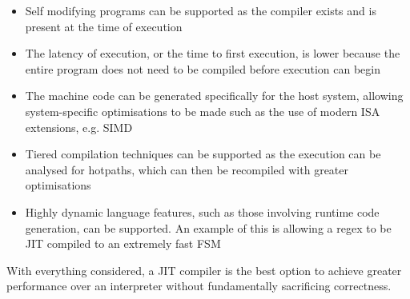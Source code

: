 \begin{itemize}
	\item Self modifying programs can be supported as the compiler exists and is present at the time of execution
	\item The latency of execution, or the time to first execution, is lower because the entire program does not need to be compiled before execution can begin
	\item The machine code can be generated specifically for the host system, allowing system-specific optimisations to be made such as the use of modern ISA extensions, e.g. SIMD
	\item Tiered compilation techniques can be supported as the execution can be analysed for hotpaths, which can then be recompiled with greater optimisations
	\item Highly dynamic language features, such as those involving runtime code generation, can be supported. An example of this is allowing a regex to be JIT compiled to an extremely fast FSM
\end{itemize}

With everything considered, a JIT compiler is the best option to achieve greater performance over an interpreter without fundamentally sacrificing correctness.
